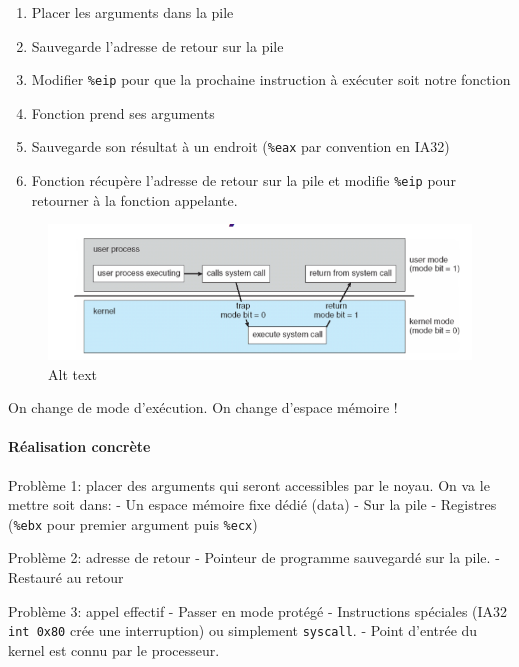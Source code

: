 \begin{enumerate}
\def\labelenumi{\arabic{enumi}.}
\tightlist
\item
  Placer les arguments dans la pile
\item
  Sauvegarde l'adresse de retour sur la pile
\item
  Modifier \texttt{\%eip} pour que la prochaine instruction à exécuter
  soit notre fonction
\item
  Fonction prend ses arguments
\item
  Sauvegarde son résultat à un endroit (\texttt{\%eax} par convention en
  IA32)
\item
  Fonction récupère l'adresse de retour sur la pile et modifie
  \texttt{\%eip} pour retourner à la fonction appelante.
\end{enumerate}

\begin{figure}
\centering
\includegraphics{image-12.png}
\caption{Alt text}
\end{figure}

On change de mode d'exécution. On change d'espace mémoire !

\paragraph{Réalisation concrète}\label{ruxe9alisation-concruxe8te}

Problème 1: placer des arguments qui seront accessibles par le noyau. On
va le mettre soit dans: - Un espace mémoire fixe dédié (data) - Sur la
pile - Registres (\texttt{\%ebx} pour premier argument puis
\texttt{\%ecx})

Problème 2: adresse de retour - Pointeur de programme sauvegardé sur la
pile. - Restauré au retour

Problème 3: appel effectif - Passer en mode protégé - Instructions
spéciales (IA32 \texttt{int\ 0x80} crée une interruption) ou simplement
\texttt{syscall}. - Point d'entrée du kernel est connu par le
processeur.

